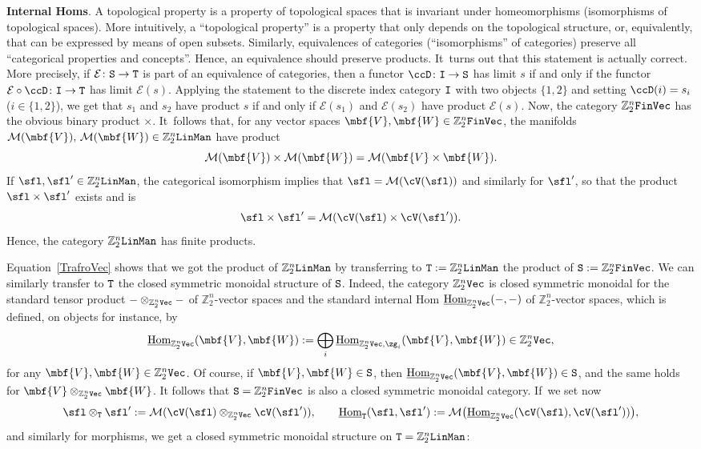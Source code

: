 \documentclass[10pt,a4paper]{amsart}
\newcommand{\op}[1]{\operatorname{#1}}
\newcommand{\Z}{{\mathbb Z}}
\def\ul{\underline}
\def\cM{\cal M}
\def\cE{\mathcal{E}}
\def\cM{\mathcal{M}}
\def\ul{\underline}
\newcommand{\0}{\otimes}
\newcommand{\z}{\Z_2^n}
\numberwithin{equation}{section}
\providecommand{\cal}{\mathcal}
\begin{document}
\noindent
{\bf Internal Homs}. A topological property is a property of topological spaces that is invariant under homeomorphisms (isomorphisms of topological spaces). More intuitively, a ``topological property'' is a property that only depends on the topological structure, or, equivalently, that can be expressed by means of open subsets. Similarly, equivalences of categories (``isomorphisms'' of categories) preserve all ``categorical properties and concepts''. Hence, an equivalence should preserve products. It~turns out that this statement is actually correct. More precisely, if $\cE\colon {\tt S}\to {\tt T}$ is part of an equivalence of categories, then a functor $\ccD\colon {\tt I}\to{\tt S}$ has limit $s$ if and only if the functor $\cE\circ\ccD\colon {\tt I}\to {\tt T}$ has limit $\cE(s)$. Applying the statement to the discrete index category ${\tt I}$ with two objects $\{1,2\}$ and setting $\ccD(i)=s_i$ ($i\in\{1,2\}$), we get that $s_1$ and $s_2$ have product $s$ if and only if $\cE(s_1)$ and $\cE(s_2)$ have product $\cE(s)$. Now, the category $\z{\tt FinVec}$ has the obvious binary product $\times$. It~follows that, for any vector spaces $\mbf{V},\mbf{W}\in\z{\tt FinVec}$, the manifolds $\cM(\mbf{V}),\, \cM(\mbf{W})\in\z{\tt LinMan}$ have product
\[
\cM(\mbf{V})\times\cM(\mbf{W})=\cM(\mbf{V}\times\mbf{W}).
\]
If $\sfl,\sfl'\in\z{\tt LinMan}$, the categorical isomorphism implies that $\sfl=\cM(\cV(\sfl))$ and similarly for $\sfl'$, so that the product $\sfl\times\sfl'$ exists and is
\begin{gather}\label{TrafroVec}
\sfl\times\sfl'=\cM(\cV(\sfl)\times\cV(\sfl')).
\end{gather}
Hence, the category $\z{\tt LinMan}$ has finite products.

Equation~\eqref{TrafroVec} shows that we got the product of $\z{\tt LinMan}$ by transferring to ${\tt T}:=\z{\tt LinMan}$ the product of ${\tt S}:=\z{\tt FinVec}$. We can similarly transfer to ${\tt T}$ the closed symmetric monoidal structure of ${\tt S}$. Indeed, the category $\z{\tt Vec}$ is closed symmetric monoidal for the standard tensor product $-\0_{\z\tt Vec}-$ of $\z$-vector spaces and the standard internal Hom $\ul{\text{Hom}}_{\z\tt Vec}(-,-)$ of $\z$-vector spaces, which is defined, on objects for instance, by
\begin{gather*}%
\ul{\text{Hom}}_{\z\tt Vec}(\mbf{V},\mbf{W}):=\bigoplus_i\ul{\text{Hom}}_{\z{\tt Vec}
,\zg_i}(\mbf{V},\mbf{W})\in\z{\tt Vec},
\end{gather*}
for any $\mbf{V},\mbf{W}\in\z\tt Vec$. Of course, if $\mbf{V},\mbf{W}\in\tt S$, then $\ul{\text{Hom}}_{\z\tt Vec}(\mbf{V},\mbf{W})\in\tt S$, and the same holds for $\mbf{V}\0_{\z\tt Vec}\mbf{W}$. It follows that ${\tt S}=\z{\tt FinVec}$ is also a closed symmetric monoidal category. If~we set now
\begin{gather}\label{CMSLinMan}
\sfl\0_{\tt T}\sfl':=\cM(\cV(\sfl)\0_{\z\tt Vec}\cV(\sfl')),\qquad \ul{\op{Hom}}_{\tt T}(\sfl,\sfl'):=\cM\big(\ul{\op{Hom}}_{\z{\tt Vec}}(\cV(\sfl),\cV(\sfl'))\big),
\end{gather}
and similarly for morphisms, we get a closed symmetric monoidal structure on ${\tt T}=\z{\tt LinMan}$:
\end{document}
